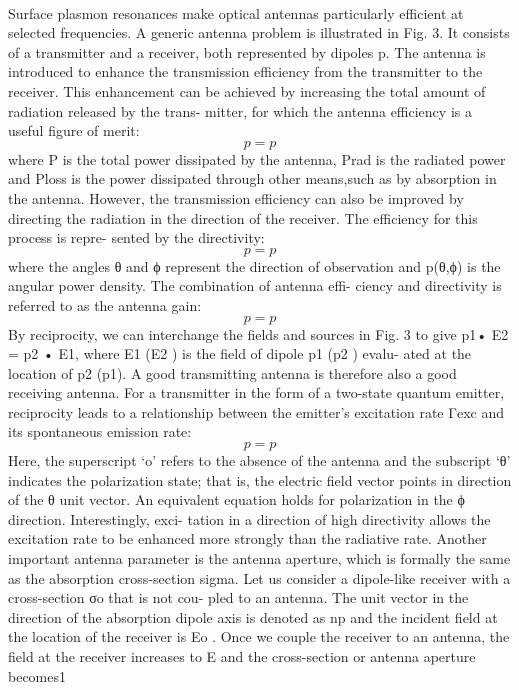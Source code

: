 		\\
		Surface plasmon resonances make optical antennas particularly efficient at selected frequencies. A generic antenna problem is illustrated in Fig. 3. It consists of a transmitter and a receiver, both represented by dipoles p. The antenna is introduced to enhance the transmission efficiency from the transmitter to the receiver. This enhancement can be achieved by increasing the total amount of radiation released by the trans- mitter, for which the antenna efficiency is a useful figure of merit:
		\begin{equation}
			p=p
		\end{equation}
		where P is the total power dissipated by the antenna, Prad is the radiated power and Ploss is the power dissipated through other means,such as by absorption in the antenna. However, the transmission efficiency can also be improved by directing the radiation in the direction of the receiver. The efficiency for this process is repre- sented by the directivity:
		\begin{equation}
			p=p
		\end{equation}
		where the angles θ and ϕ represent the direction of observation and p(θ,ϕ) is the angular power density. The combination of antenna effi- ciency and directivity is referred to as the antenna gain:
		\begin{equation}
			p=p
		\end{equation}
		By reciprocity, we can interchange the fields and sources in Fig. 3 to give p1• E2 = p2 • E1, where E1 (E2 ) is the field of dipole p1 (p2 ) evalu- ated at the location of p2 (p1). A good transmitting antenna is therefore also a good receiving antenna. For a transmitter in the form of a two-state quantum emitter, reciprocity leads to a relationship between the emitter’s excitation rate Γexc and its spontaneous emission rate:
		\begin{equation}
			p=p
		\end{equation}
		Here, the superscript ‘o’ refers to the absence of the antenna and the subscript ‘θ’ indicates the polarization state; that is, the electric field vector points in direction of the θ unit vector. An equivalent equation holds for polarization in the ϕ direction. Interestingly, exci- tation in a direction of high directivity allows the excitation rate to be enhanced more strongly than the radiative rate. Another important antenna parameter is the antenna aperture, which is formally the same as the absorption cross-section sigma. Let us consider a dipole-like receiver with a cross-section σo that is not cou- pled to an antenna. The unit vector in the direction of the absorption dipole axis is denoted as np and the incident field at the location of the receiver is Eo . Once we couple the receiver to an antenna, the field at the receiver increases to E and the cross-section or antenna aperture becomes1
